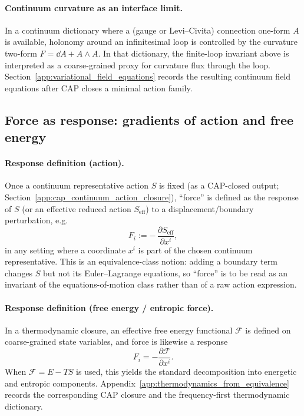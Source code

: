 \paragraph{Continuum curvature as an interface limit.}
\InterfaceTag In a continuum dictionary where a (gauge or Levi--Civita) connection one-form $A$ is available,
holonomy around an infinitesimal loop is controlled by the curvature two-form $F=\dd A+A\wedge A$.
In that dictionary, the finite-loop invariant above is interpreted as a coarse-grained proxy for curvature flux through the loop.
Section~\ref{app:variational_field_equations} records the resulting continuum field equations after CAP closes a minimal action family.

\subsection{Force as response: gradients of action and free energy}
\label{subsec:force_as_response}

\paragraph{Response definition (action).}
\InterfaceTag Once a continuum representative action $S$ is fixed (as a CAP-closed output; Section~\ref{app:cap_continuum_action_closure}),
``force'' is defined as the response of $S$ (or an effective reduced action $S_{\mathrm{eff}}$) to a displacement/boundary perturbation, e.g.
\[
F_i:=-\,\frac{\partial S_{\mathrm{eff}}}{\partial x^i},
\]
in any setting where a coordinate $x^i$ is part of the chosen continuum representative.
This is an equivalence-class notion: adding a boundary term changes $S$ but not its Euler--Lagrange equations, so ``force'' is to be read as an invariant of the equations-of-motion class rather than of a raw action expression.

\paragraph{Response definition (free energy / entropic force).}
\InterfaceTag In a thermodynamic closure, an effective free energy functional $\mathcal{F}$ is defined on coarse-grained state variables, and force is likewise a response
\[
F_i=-\frac{\partial \mathcal{F}}{\partial x^i}.
\]
When $\mathcal{F}=E-TS$ is used, this yields the standard decomposition into energetic and entropic components.
Appendix~\ref{app:thermodynamics_from_equivalence} records the corresponding CAP closure and the frequency-first thermodynamic dictionary.

